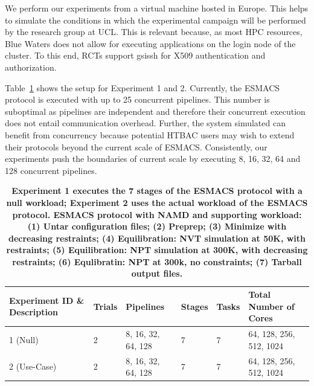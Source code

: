 We perform our experiments from a virtual machine hosted in Europe. This
helps to simulate the conditions in which the experimental campaign will be
performed by the research group at UCL\@. This is relevant because, as most
HPC resources, Blue Waters does not allow for executing applications on the
login node of the cluster. To this end, RCTs support \textmd{gsissh} for X509
authentication and authorization.

Table~\ref{tab:exp} shows the setup for Experiment 1 and 2. Currently, the
ESMACS protocol is executed with up to 25 concurrent pipelines. This number
is suboptimal as pipelines are independent and therefore their concurrent
execution does not entail communication overhead. Further, the system
simulated can benefit from concurrency because potential HTBAC users may wish
to extend their protocols beyond the current scale of ESMACS\@. Consistently,
our experiments push the boundaries of current scale by executing 8, 16, 32,
64 and 128 concurrent pipelines.

\begin{table}[t]
\centering
\caption{\bf Experiment 1 executes the 7 stages of the ESMACS protocol with
a null workload; Experiment 2 uses the actual workload of the ESMACS
protocol. ESMACS protocol with NAMD and supporting workload: (1) Untar
configuration files; (2) Preprep; (3) Minimize with decreasing restraints;
(4) Equilibration: NVT simulation at 50K, with restraints; (5) Equilibration:
NPT simulation at 300K, with decreasing restraints; (6) Equlibratin: NPT at
300k, no constraints; (7) Tarball output files.}\label{tab:exp}
\begin{tabular}{llllll}
\hline
\multicolumn{1}{l|}{Experiment ID \& Description} & \multicolumn{1}{l|}{Trials} & \multicolumn{1}{l|}{Pipelines} & \multicolumn{1}{l}{Stages} & \multicolumn{1}{l|}{Tasks} & \multicolumn{1}{l}{Total Number of Cores} \\ \hline
1 (Null)                                           & 2                           & 8, 16, 32, 64, 128             & 7                           & 7                          & 64, 128, 256, 512, 1024                    \\ \hline
2 (Use-Case)                                       & 2                           & 8, 16, 32, 64, 128             & 7                           & 7                          & 64, 128, 256, 512, 1024                    \\ \hline
\end{tabular}
\end{table}


